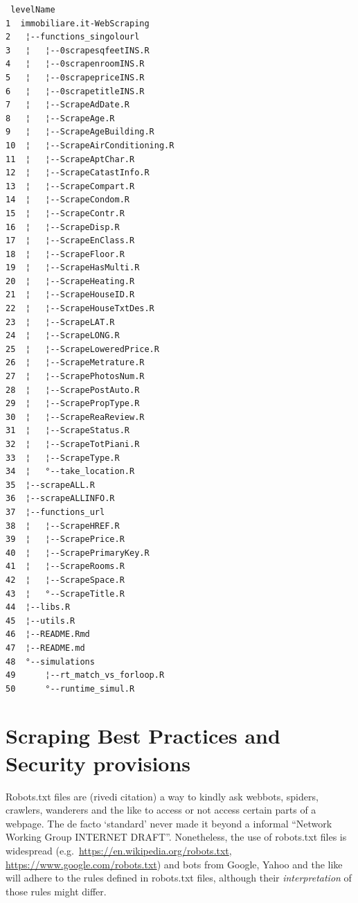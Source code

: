 \documentclass[
  12pt,
  a4paper,
  oneside]{book}
\begin{document}
\begin{verbatim}
 levelName
1  immobiliare.it-WebScraping     
2   ¦--functions_singolourl       
3   ¦   ¦--0scrapesqfeetINS.R     
4   ¦   ¦--0scrapenroomINS.R      
5   ¦   ¦--0scrapepriceINS.R      
6   ¦   ¦--0scrapetitleINS.R      
7   ¦   ¦--ScrapeAdDate.R         
8   ¦   ¦--ScrapeAge.R            
9   ¦   ¦--ScrapeAgeBuilding.R    
10  ¦   ¦--ScrapeAirConditioning.R
11  ¦   ¦--ScrapeAptChar.R        
12  ¦   ¦--ScrapeCatastInfo.R     
13  ¦   ¦--ScrapeCompart.R        
14  ¦   ¦--ScrapeCondom.R         
15  ¦   ¦--ScrapeContr.R          
16  ¦   ¦--ScrapeDisp.R           
17  ¦   ¦--ScrapeEnClass.R        
18  ¦   ¦--ScrapeFloor.R          
19  ¦   ¦--ScrapeHasMulti.R       
20  ¦   ¦--ScrapeHeating.R        
21  ¦   ¦--ScrapeHouseID.R        
22  ¦   ¦--ScrapeHouseTxtDes.R    
23  ¦   ¦--ScrapeLAT.R            
24  ¦   ¦--ScrapeLONG.R           
25  ¦   ¦--ScrapeLoweredPrice.R   
26  ¦   ¦--ScrapeMetrature.R      
27  ¦   ¦--ScrapePhotosNum.R      
28  ¦   ¦--ScrapePostAuto.R       
29  ¦   ¦--ScrapePropType.R       
30  ¦   ¦--ScrapeReaReview.R      
31  ¦   ¦--ScrapeStatus.R         
32  ¦   ¦--ScrapeTotPiani.R       
33  ¦   ¦--ScrapeType.R           
34  ¦   °--take_location.R        
35  ¦--scrapeALL.R                
36  ¦--scrapeALLINFO.R            
37  ¦--functions_url              
38  ¦   ¦--ScrapeHREF.R           
39  ¦   ¦--ScrapePrice.R          
40  ¦   ¦--ScrapePrimaryKey.R     
41  ¦   ¦--ScrapeRooms.R          
42  ¦   ¦--ScrapeSpace.R          
43  ¦   °--ScrapeTitle.R          
44  ¦--libs.R                     
45  ¦--utils.R                    
46  ¦--README.Rmd                 
47  ¦--README.md                  
48  °--simulations                
49      ¦--rt_match_vs_forloop.R  
50      °--runtime_simul.R
\end{verbatim}

\hypertarget{best-practices}{%
\section{Scraping Best Practices and Security provisions}\label{best-practices}}

Robots.txt files are (rivedi citation) a way to kindly ask webbots, spiders, crawlers, wanderers and the like to access or not access certain parts of a webpage. The de facto `standard' never made it beyond a informal ``Network Working Group INTERNET DRAFT''. Nonetheless, the use of robots.txt files is widespread (e.g.~\url{https://en.wikipedia.org/robots.txt}, \url{https://www.google.com/robots.txt}) and bots from Google, Yahoo and the like will adhere to the rules defined in robots.txt files, although their \emph{interpretation} of those rules might differ.
\end{document}

